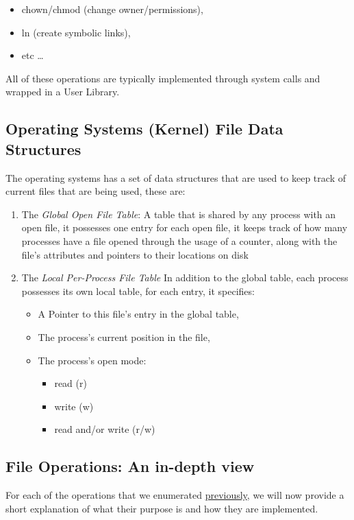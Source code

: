 \documentclass[openright, twoside]{report}
\theoremstyle{definition}
\theoremstyle{example}
\begin{document}
\begin{itemize}
	\item chown/chmod (change owner/permissions),
	\item ln (create symbolic links),
	\item etc \dots
\end{itemize}

All of these operations are typically implemented through system calls and wrapped 
in a User Library.

\subsection{Operating Systems (Kernel) File Data Structures}

The operating systems has a set of data structures that are used to keep track 
of current files that are being used, these are:

\begin{enumerate}
	\item The \emph{Global Open File Table}:
	A table that is shared by any process with an open file, it possesses one entry 
	for each open file, it keeps track of how many processes have a file opened through 
	the usage of a counter, along with the file's attributes and pointers to their locations
	on disk
	\item The \emph{Local Per-Process File Table}
	In addition to the global table, each process possesses its own local table, for 
	each entry, it specifies:
	\begin{itemize}
		\item A Pointer to this file's entry in the global table,
		\item The process's current position in the file,
		\item The process's open mode:
		\begin{itemize}
			\item read (r)
			\item write (w)
			\item read and/or write (r/w)
		\end{itemize}
	\end{itemize}

\end{enumerate}
\subsection{File Operations: An in-depth view}
For each of the operations that we enumerated \hyperref[par:fops1]{previously}, we will 
now provide a short explanation of what their purpose is and how they are implemented.
\end{document}
